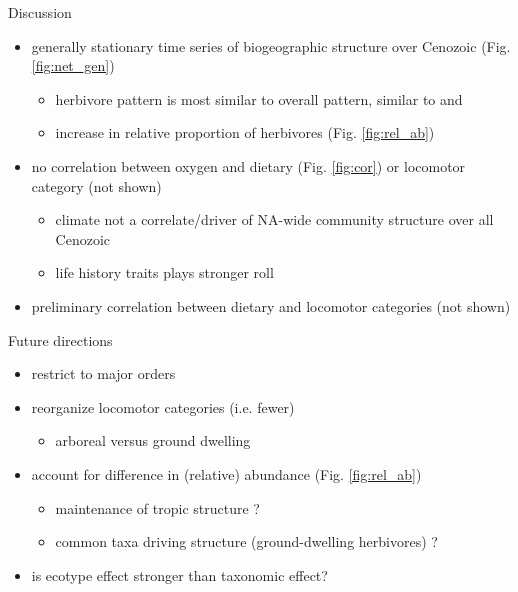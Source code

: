 \documentclass[final]{beamer}\usepackage[]{graphicx}\usepackage[]{color}
\newlength{\onecolwid}
\begin{document}
\begin{frame}[t]
\begin{columns}[t]
    \begin{columns}[t,totalwidth = \onecolwid]
      \begin{column}{\onecolwid}
        \begin{block}{Discussion}
          \begin{itemize}
            \item generally stationary time series of biogeographic structure over Cenozoic (Fig. \ref{fig:net_gen})
            \begin{itemize}
              \item herbivore pattern is most similar to overall pattern, similar to \citet{Jernvall2002} and \citet{Jernvall2004}
              \item increase in relative proportion of herbivores (Fig. \ref{fig:rel_ab})
            \end{itemize}
            \item no correlation between oxygen and dietary (Fig. \ref{fig:cor}) or locomotor category (not shown)
              \begin{itemize}
                \item climate not a correlate/driver of NA-wide community structure over all Cenozoic
                \item life history traits plays stronger roll
              \end{itemize}
            \item preliminary correlation between dietary and locomotor categories (not shown)
          \end{itemize}
        \end{block}

        \begin{block}{Future directions}
          \begin{itemize}
            \item restrict to major orders \citep{Jernvall2004}
            \item reorganize locomotor categories (i.e. fewer)
            \begin{itemize}
              \item arboreal versus ground dwelling
            \end{itemize}
            \item account for difference in (relative) abundance (Fig. \ref{fig:rel_ab})
            \begin{itemize}
              \item maintenance of tropic structure \citep{Jernvall2004}?
              \item common taxa driving structure (ground-dwelling herbivores) \citep{Jernvall2002}?
            \end{itemize}
            \item is ecotype effect stronger than taxonomic effect?
          \end{itemize}
        \end{block}



\end{column}
\end{columns}
\end{columns}
\end{frame}
\end{document}
